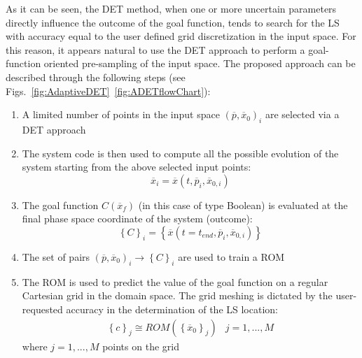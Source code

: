 As it can be seen, the DET method, when one or more uncertain parameters directly influence the outcome of the goal function, tends to search for the LS with accuracy equal to the user defined grid discretization in the input space. 
For this reason, it appears natural to use the DET approach to perform a goal-function oriented pre-sampling of the input space. The proposed approach can be described through the following steps (see Figs.~\ref{fig:AdaptiveDET}~\ref{fig:ADETflowChart}):
\begin{enumerate} 
\item A limited number of points in the input space $\left ( \overline{p},\overline{x}_{0} \right )_{i}$ are selected via a DET approach
\item The system code is then used to compute all the possible evolution of the system starting from the above selected input points:
\begin{equation}
    \overline{x}_{i}=\overline{x}\left (t,\overline{p}_{i},\overline{x}_{0,i}  \right )
\end{equation}
\item The goal function  $C\left (\overline{x}_{f}\right )$ (in this case of type Boolean) is evaluated at the final phase space coordinate of the system (outcome): 
\begin{equation}
 \left \{ C \right \}_{i}=\left \{ \overline{x} \left (  t=t_{end},\overline{p}_{i},\overline{x}_{0,i}\right )\right \}
\end{equation}
\item The set of pairs $\left ( \overline{p},\overline{x}_{0} \right )_{i} \rightarrow \left \{ C \right \}_{i}$ are used to train a ROM
\item The ROM is used to predict the value of the goal function on a regular Cartesian grid  in the domain space. The grid meshing is dictated by the user-requested accuracy in the determination of the LS location:
\begin{equation}
 \begin{matrix}
 \left \{ c \right \}_{j} \cong ROM\left ( \left \{ \overline{x}_{0} \right \}_{j} \right ) & j=1,...,M
\end{matrix}
\end{equation}
where $j=1, ..., M$ points on the grid 

\end{enumerate}
